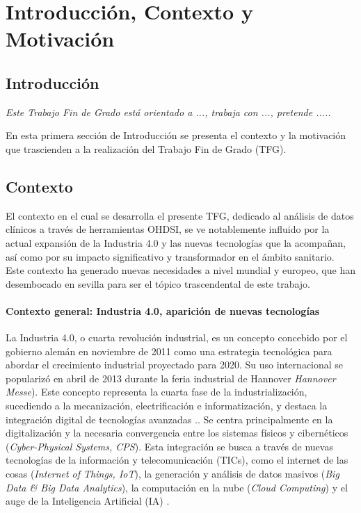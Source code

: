 \chapter{Introducción, Contexto y Motivación}\label{cap:introduccion}


\section{Introducción}

\textit{Este Trabajo Fin de Grado está orientado a ..., trabaja con ..., pretende .....}

En esta primera sección de Introducción se presenta el contexto y la motivación que trascienden a la realización del Trabajo Fin de Grado (TFG).



\section{Contexto}
 
El contexto en el cual se desarrolla el presente TFG, dedicado al análisis de datos clínicos a través de herramientas OHDSI, se ve notablemente influido por la actual expansión de la Industria 4.0 y las nuevas tecnologías que la acompañan, así como por su impacto significativo y transformador en el ámbito sanitario. Este contexto ha generado nuevas necesidades a nivel mundial y europeo, que han desembocado en sevilla para ser el tópico trascendental de este trabajo.


\subsubsection{Contexto general: Industria 4.0, aparición de nuevas tecnologías}

La Industria 4.0, o cuarta revolución industrial, es un concepto concebido por el gobierno alemán en noviembre de 2011 como una estrategia tecnológica para abordar el crecimiento industrial proyectado para 2020. Su uso internacional se popularizó en abril de 2013 durante la feria industrial de Hannover \textit{Hannover Messe}). Este concepto representa la cuarta fase de la industrialización, sucediendo a la mecanización, electrificación e informatización, y destaca la integración digital de tecnologías avanzadas \cite{lasi2014industry}..
Se centra principalmente en la digitalización y la necesaria convergencia entre los sistemas físicos y cibernéticos (\textit{Cyber-Physical Systems, CPS}). Esta integración se busca a través de nuevas tecnologías de la información y telecomunicación (TICs), como el internet de las cosas (\textit{Internet of Things, IoT}), la generación y análisis de datos masivos (\textit{Big Data \& Big Data Analytics}), la computación en la nube (\textit{Cloud Computing}) y el auge de la Inteligencia Artificial (IA) \cite{lasi2014industry}.\cite{chen2020times}\cite{tortorella2020healthcare}


